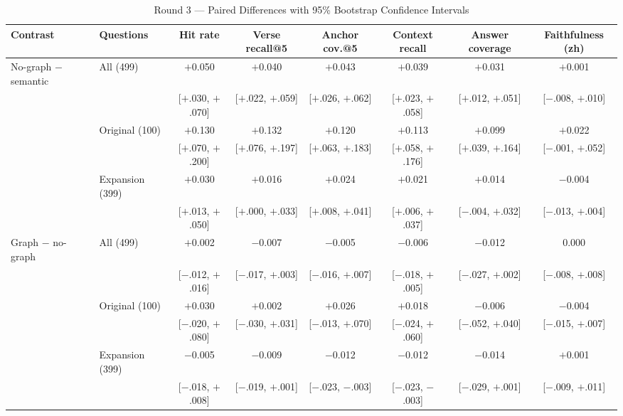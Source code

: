 \begin{table}[!t]
\caption{Round 3 --- Paired Differences with 95\% Bootstrap Confidence
Intervals}
\label{tab:round3paired}
\centering
\begin{threeparttable}
\footnotesize
\begin{tabular}{@{}llcccccc@{}}
\toprule
Contrast & Questions & Hit rate & Verse recall@5 & Anchor cov.@5 &
Context recall & Answer coverage & Faithfulness (zh) \\
\midrule
No-graph $-$ semantic & All (499) & $+$0.050 & $+$0.040 & $+$0.043 & $+$0.039 & $+$0.031 & $+$0.001 \\
 & & {\scriptsize [$+$.030, $+$.070]} & {\scriptsize [$+$.022, $+$.059]} & {\scriptsize [$+$.026, $+$.062]} & {\scriptsize [$+$.023, $+$.058]} & {\scriptsize [$+$.012, $+$.051]} & {\scriptsize [$-$.008, $+$.010]} \\
 & Original (100) & $+$0.130 & $+$0.132 & $+$0.120 & $+$0.113 & $+$0.099 & $+$0.022 \\
 & & {\scriptsize [$+$.070, $+$.200]} & {\scriptsize [$+$.076, $+$.197]} & {\scriptsize [$+$.063, $+$.183]} & {\scriptsize [$+$.058, $+$.176]} & {\scriptsize [$+$.039, $+$.164]} & {\scriptsize [$-$.001, $+$.052]} \\
 & Expansion (399) & $+$0.030 & $+$0.016 & $+$0.024 & $+$0.021 & $+$0.014 & $-$0.004 \\
 & & {\scriptsize [$+$.013, $+$.050]} & {\scriptsize [$+$.000, $+$.033]} & {\scriptsize [$+$.008, $+$.041]} & {\scriptsize [$+$.006, $+$.037]} & {\scriptsize [$-$.004, $+$.032]} & {\scriptsize [$-$.013, $+$.004]} \\
\midrule
Graph $-$ no-graph & All (499) & $+$0.002 & $-$0.007 & $-$0.005 & $-$0.006 & $-$0.012 & 0.000 \\
 & & {\scriptsize [$-$.012, $+$.016]} & {\scriptsize [$-$.017, $+$.003]} & {\scriptsize [$-$.016, $+$.007]} & {\scriptsize [$-$.018, $+$.005]} & {\scriptsize [$-$.027, $+$.002]} & {\scriptsize [$-$.008, $+$.008]} \\
 & Original (100) & $+$0.030 & $+$0.002 & $+$0.026 & $+$0.018 & $-$0.006 & $-$0.004 \\
 & & {\scriptsize [$-$.020, $+$.080]} & {\scriptsize [$-$.030, $+$.031]} & {\scriptsize [$-$.013, $+$.070]} & {\scriptsize [$-$.024, $+$.060]} & {\scriptsize [$-$.052, $+$.040]} & {\scriptsize [$-$.015, $+$.007]} \\
 & Expansion (399) & $-$0.005 & $-$0.009 & $-$0.012 & $-$0.012 & $-$0.014 & $+$0.001 \\
 & & {\scriptsize [$-$.018, $+$.008]} & {\scriptsize [$-$.019, $+$.001]} & {\scriptsize [$-$.023, $-$.003]} & {\scriptsize [$-$.023, $-$.003]} & {\scriptsize [$-$.029, $+$.001]} & {\scriptsize [$-$.009, $+$.011]} \\

\end{tabular}
\end{threeparttable}
\end{table}
